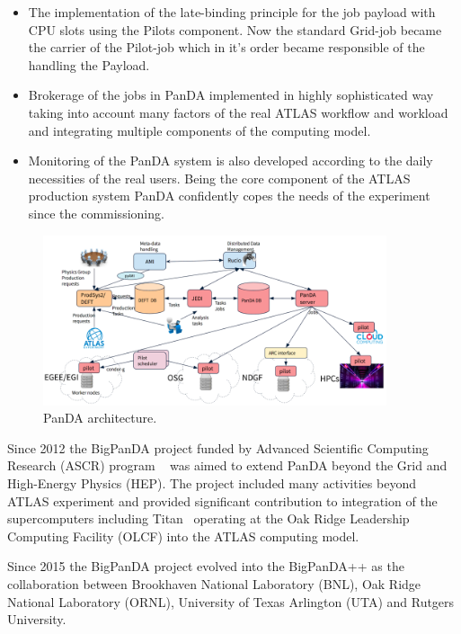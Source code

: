 \documentclass{webofc}
\begin{document}
\begin{itemize}
	\item The implementation of the late-binding principle for the job payload with CPU slots using the Pilots component. Now the standard Grid-job became the carrier of the Pilot-job which in it’s order became responsible of the handling the Payload. 
	\item Brokerage of the jobs in PanDA implemented in highly sophisticated way taking into account many factors of the real ATLAS workflow and workload and integrating multiple components of the computing model. 
	\item Monitoring of the PanDA system is also developed according to the daily necessities of the real users. Being the core component of the ATLAS production system PanDA confidently copes the needs of the experiment since the commissioning. 
\end{itemize}

\begin{figure}
	\centering
	\includegraphics[width=0.90\textwidth]{figures/PanDA_architecture.png}
	\caption{PanDA architecture.}
	\label{fig:panda-arch}
\end{figure}

Since 2012 the BigPanDA project funded by Advanced Scientific Computing Research (ASCR) program ~\cite{DOEASCR} was aimed to extend PanDA beyond the Grid and High-Energy Physics (HEP). The project included many activities beyond ATLAS experiment and provided significant contribution to integration of the supercomputers including Titan~\cite{Titan} operating at the Oak Ridge Leadership Computing Facility (OLCF) into the ATLAS computing model. 

Since 2015 the BigPanDA project evolved into the  BigPanDA++ as the collaboration between Brookhaven National Laboratory (BNL), Oak Ridge National Laboratory (ORNL),  University of Texas Arlington (UTA) and Rutgers University.
\end{document}
